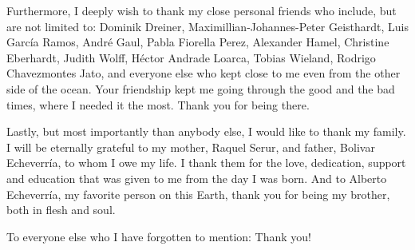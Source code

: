 \begin{changemargin}{-0.2cm}{-0.2cm}
Furthermore, I deeply wish to thank my close personal friends who include, but
are not limited to: Dominik Dreiner, Maximillian-Johannes-Peter Geisthardt, Luis Garc{\'i}a Ramos, Andr{\'e} Gaul, Pabla Fiorella Perez, Alexander Hamel, Christine Eberhardt, Judith Wolff, H{\'e}ctor Andrade Loarca, Tobias Wieland, Rodrigo Chavezmontes Jato, and everyone else who kept close to me even from the other side of the ocean. Your friendship kept me going through the good and the bad times, where I needed it the most. Thank you for being there.

Lastly, but most importantly than anybody else, I would like to thank my family. I will be eternally grateful to my mother, Raquel Serur, and father, Bolivar Echeverr{\'i}a, to whom I owe my life. I thank them for the love, dedication, support and education that was given to me from the day I was born. And to Alberto Echeverr{\'i}a, my favorite person on this Earth, thank you for being my brother, both in flesh and soul. %

\medskip

To everyone else who I have forgotten to mention: Thank you!
\end{changemargin}
\afterpage{\blankpage}
